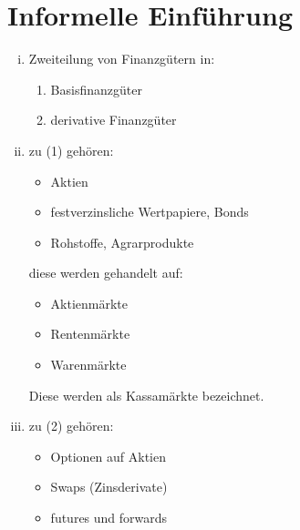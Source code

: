 
\newpage

\setcounter{page}{1}


\section{Informelle Einführung} %
\label{sec: informelle_einführung}

\begin{enumerate}[(i)]
	\item Zweiteilung von Finanzgütern in:
	\begin{enumerate}[(1)]
		\item Basisfinanzgüter
		\item derivative Finanzgüter
	\end{enumerate}
	\item zu (1) gehören:
	\begin{itemize}
		\item Aktien
		\item festverzinsliche Wertpapiere, Bonds
		\item Rohstoffe, Agrarprodukte
	\end{itemize}
diese werden gehandelt auf:
	\begin{itemize}
		\item Aktienmärkte
		\item Rentenmärkte
		\item Warenmärkte
	\end{itemize}
Diese werden als Kassamärkte bezeichnet.

	\item zu (2) gehören:
	\begin{itemize}
		\item Optionen auf Aktien
		\item Swaps (Zinsderivate)
		\item futures und forwards
	\end{itemize}

\end{enumerate}

